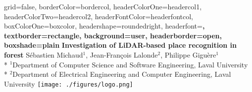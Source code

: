 \documentclass[a0paper,portrait]{baposter}
\begin{document}

\begin{poster}{
        grid=false,
        borderColor=bordercol, %
        headerColorOne=headercol1, %
        headerColorTwo=headercol2, %
        headerFontColor=headerfontcol, %
        boxColorOne=boxcolor, %
        headershape=roundedright, %
        headerfont=\Large\sf\bf, %
        textborder=rectangle,
        background=user,
        headerborder=open, %
        boxshade=plain
    }
    {}
    {\sf\bf Investigation of LiDAR-based place recognition in forest}
    {\vspace{0.2em} Sébastien Michaud$^1$, Jean-François Lalonde$^2$, Philippe Giguère$^1$\\* %
        {\vspace{-0.4em}\small $^1$Department of Computer Science and Software Engineering, Laval University}\\*
        {\vspace{-0.2em}\small $^2$Department of Electrical Engineering and Computer Engineering, Laval University}}
    {\texttt{[image: ./figures/logo.png]}} %

\end{poster}
\end{document}
